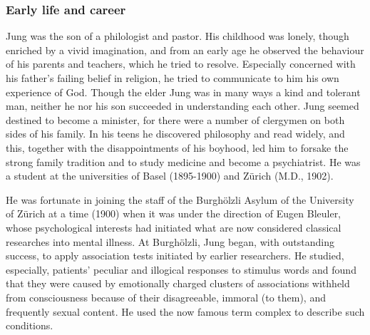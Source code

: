 \documentclass[12pt]{article}
\begin{document}
\subsubsection{Early life and career}
Jung was the son of a philologist and pastor. His childhood was lonely,
                                      though enriched by a vivid imagination, and from an early age he
                                      observed the behaviour of his parents and teachers, which he tried to
                                      resolve. Especially concerned with his father's failing belief in
                                      religion, he tried to communicate to him his own experience of God.
                                      Though the elder Jung was in many ways a kind and tolerant man,
                                      neither he nor his son succeeded in understanding each other. Jung
                                      seemed destined to become a minister, for there were a number of
                                      clergymen on both sides of his family. In his teens he discovered
                                      philosophy and read widely, and this, together with the
                                      disappointments of his boyhood, led him to forsake the strong family
                                      tradition and to study medicine and become a psychiatrist. He was a
                                      student at the universities of Basel (1895-1900) and Z\"{u}rich (M.D.,
                                      1902). 

                                      He was fortunate in joining the staff of the Burgh\"{o}lzli Asylum of the
                                      University of Z\"{u}rich at a time (1900) when it was under the direction
                                      of Eugen Bleuler, whose psychological interests had initiated what
                                      are now considered classical researches into mental illness. At
                                      Burgh\"{o}lzli, Jung began, with outstanding success, to apply association
                                      tests initiated by earlier researchers. He studied, especially,
                                      patients' peculiar and illogical responses to stimulus words and found
                                      that they were caused by emotionally charged clusters of
                                      associations withheld from consciousness because of their
                                      disagreeable, immoral (to them), and frequently sexual content. He
                                      used the now famous term complex to describe such conditions. 
\end{document}
